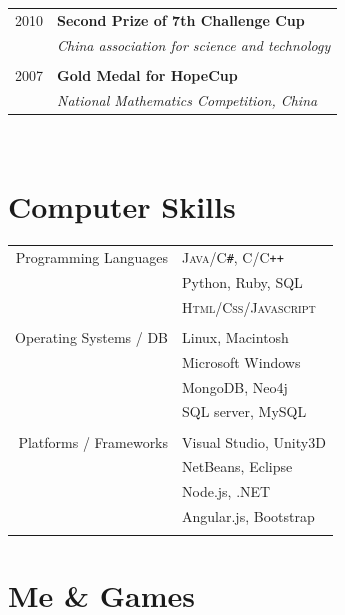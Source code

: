 \documentclass[10pt]{article}
\begin{document}
{\begin{minipage}[t]{0.44\textwidth}
\begin{tabular}{rl}
2010	 & \textbf{Second Prize of 7th Challenge Cup}\\
& \textit{China association for science and technology}\\ \\


2007	 & \textbf{Gold Medal for HopeCup}\\
& \textit{National Mathematics Competition, China}
\end{tabular}\\[10pt]


\section{Computer Skills} 

\begin{tabular}{r l}
Programming Languages
& \textsc{Java/C\texttt{\#}, C/C\texttt{++}}\\
& Python, Ruby, SQL\\
& \textsc{Html/Css/Javascript}\\ 
& \\
Operating Systems / DB
& Linux, Macintosh\\
& Microsoft Windows \\
& MongoDB, Neo4j \\
& SQL server, MySQL \\
& \\
Platforms / Frameworks
& Visual Studio, Unity3D\\
& NetBeans, Eclipse \\
& Node.js, .NET\\
& Angular.js, Bootstrap \\
& \\
\end{tabular}


\section{Me \& Games} 


\end{minipage}}
\end{document}
